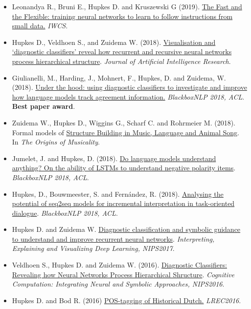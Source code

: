 \begin{itemize}
    \item Leonandya R., Bruni E., Hupkes D. and Kruszewski G (2019). \href{https://www.aclweb.org/anthology/W19-0419/}{The Fast and the Flexible: training neural networks to learn to follow instructions from small data.} \textit{IWCS}. 
    
    \item Hupkes D., Veldhoen S., and Zuidema W. (2018). \href{https://jair.org/index.php/jair/article/view/11196/26408}{Visualisation and ‘diagnostic classifiers’ reveal how recurrent and recursive neural networks process hierarchical structure}. \textit{Journal of Artificial Intelligence Research}.
    
    \item Giulianelli, M., Harding, J., Mohnert, F., Hupkes, D. and Zuidema, W. (2018). \href{https://aclweb.org/anthology/W18-5426}{Under the hood: using diagnostic classifiers to investigate and improve how language models track agreement information.} \textit{BlackboxNLP 2018, ACL}. \\ \textbf{Best paper award}.
    
    \item Zuidema W., Hupkes D., Wiggins G., Scharf C. and Rohrmeier M. (2018). Formal models of \href{https://arxiv.org/abs/1901.05180}{Structure Building in Music, Language and Animal Song}. In \textit{The Origins of Musicality}.
    
    \item Jumelet, J. and Hupkes, D. (2018). \href{https://aclweb.org/anthology/W18-5424}{Do language models understand anything? On the ability of LSTMs to understand negative polarity items}. \textit{BlackboxNLP 2018, ACL}.
    
    \item Hupkes, D., Bouwmeester, S. and Fernández, R. (2018). \href{https://aclweb.org/anthology/W18-5419}{Analysing the potential of seq2seq models for incremental interpretation in task-oriented dialogue}. \textit{BlackboxNLP 2018, ACL}.
    
    \item Hupkes D. and Zuidema W. \href{http://www.interpretable-ml.org/nips2017workshop/papers/12.pdf}{Diagnostic classification and symbolic guidance to understand and improve recurrent neural networks}. \textit{Interpreting, Explaining and Visualizing Deep Learning, NIPS2017}.
    
    \item Veldhoen S., Hupkes D. and Zuidema W. (2016). \href{http://dieuwkehupkes.nl/research/nips2016.pdf}{Diagnostic Classifiers: Revealing how Neural
Networks Process Hierarchical Shructure}. \textit{Cognitive Computation: Integrating Neural and
Symbolic Approaches, NIPS2016}.

    \item Hupkes D. and Bod R. (2016) \href{https://www.aclweb.org/anthology/L16-1012}{POS-tagging of Historical Dutch.} \textit{LREC2016}.
\end{itemize}